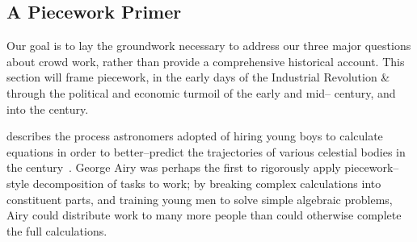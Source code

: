 \documentclass[trackingWork]{subfiles}
\begin{document}
\subsection{A Piecework Primer}\label{sec:pieceworkPrimer} %
 Our goal is to lay the groundwork necessary to address our three major questions about crowd work, rather than provide a comprehensive historical account.
This section will frame piecework,
in the early days of the Industrial Revolution \&
through the political and economic turmoil of the early and mid-- century,
and into the  century.


\citeauthor{grier2013computers} describes the process astronomers adopted of hiring young boys
to calculate equations in order
to better--predict the trajectories of various celestial bodies in the  century~\cite{grier2013computers}.
George Airy was perhaps the first to rigorously apply piecework--style decomposition of tasks to work;
by breaking complex calculations into constituent parts, and
training young men to solve simple algebraic problems,
Airy could distribute work to many more people than could otherwise complete the full calculations.
\end{document}
